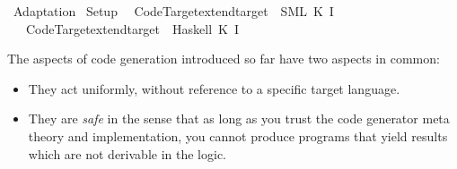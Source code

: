 %
\begin{isabellebody}%
\def\isabellecontext{Adaptation}%
%
\isadelimtheory
%
\endisadelimtheory
%
\isatagtheory
{}\isamarkupfalse%
\ Adaptation\isanewline
{}\ Setup\isanewline
{}%
\endisatagtheory
{\isafoldtheory}%
%
\isadelimtheory
\isanewline
%
\endisadelimtheory
%
\isadeliminvisible
\isanewline
%
\endisadeliminvisible
%
\isataginvisible
{}\isamarkupfalse%
\ {}\ Code{}Target{}extend{}target\ {}{}{}{}{}\ {}{}SML{}{}\ K\ I{}{}\isanewline
\ \ {}{}\ Code{}Target{}extend{}target\ {}{}{}{}{}\ {}{}Haskell{}{}\ K\ I{}{}\ {}%
\endisataginvisible
{\isafoldinvisible}%
%
\isadeliminvisible
%
\endisadeliminvisible
%
\isamarkuptrue%
%
\isamarkuptrue%
%
\begin{isamarkuptext}%
The aspects of code generation introduced so far have two aspects
  in common:

  \begin{itemize}

    \item They act uniformly, without reference to a specific target
       language.

    \item They are \emph{safe} in the sense that as long as you trust
       the code generator meta theory and implementation, you cannot
       produce programs that yield results which are not derivable in
       the logic.


\end{itemize}
\end{isamarkuptext}
\end{isabellebody}
